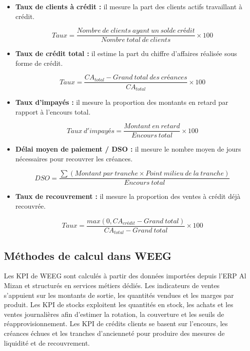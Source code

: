 \documentclass[a4paper,12pt]{report}
\begin{document}
\begin{itemize}
    \item \textbf{Taux de clients à crédit :} il mesure la part des clients
    actifs travaillant à crédit.

    \[
        Taux = \frac{Nombre\ de\ clients\ ayant\ un\ solde\ crédit}{Nombre\ total\ de\ clients} \times 100
    \]

    \item \textbf{Taux de crédit total :} il estime la part du chiffre
    d'affaires réalisée sous forme de crédit.

    \[
        Taux = \frac{CA_{total} - Grand\ total\ des\ créances}{CA_{total}} \times 100
    \]

    \item \textbf{Taux d'impayés :} il mesure la proportion des montants en
    retard par rapport à l'encours total.

    \[
        Taux\ d'impayés = \frac{Montant\ en\ retard}{Encours\ total} \times 100
    \]

    \item \textbf{Délai moyen de paiement / DSO :} il mesure le nombre moyen de
    jours nécessaires pour recouvrer les créances.

    \[
        DSO = \frac{\sum(Montant\ par\ tranche \times Point\ milieu\ de\ la\ tranche)}{Encours\ total}
    \]

    \item \textbf{Taux de recouvrement :} il mesure la proportion des ventes à
    crédit déjà recouvrée.

    \[
        Taux = \frac{max(0, CA_{crédit} - Grand\ total)}{CA_{total} - Grand\ total} \times 100
    \]
\end{itemize}

\subsection{Méthodes de calcul dans WEEG}

Les KPI de WEEG sont calculés à partir des données importées depuis l'ERP Al
Mizan et structurés en services métiers dédiés. Les indicateurs de ventes
s'appuient sur les montants de sortie, les quantités vendues et les marges par
produit. Les KPI de stocks exploitent les quantités en stock, les achats et les
ventes journalières afin d'estimer la rotation, la couverture et les seuils de
réapprovisionnement. Les KPI de crédits clients se basent sur l'encours, les
créances échues et les tranches d'ancienneté pour produire des mesures de
liquidité et de recouvrement.
\end{document}
